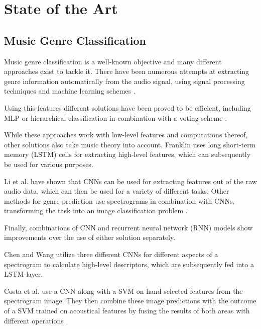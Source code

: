 
\chapter{State of the Art}

\label{stateofart}

\section{Music Genre Classification}

Music genre classification is a well-known objective and many different approaches exist to tackle it.
There have been numerous attempts at extracting genre information automatically from the audio signal, 
using signal processing techniques and machine learning schemes \cite{Aucouturier2003}.

Using this features different solutions have been proved to be efficient, 
including MLP or hierarchical classification in combination with a voting scheme \cite{Murauer2017}.

While these approaches work with low-level features and computations thereof, other solutions also take music theory into account.
Franklin \cite{Franklin2006} uses long short-term memory (LSTM) cells for extracting high-level features, which can subsequently be used for various
purposes. 

Li et al. \cite{Li2010} have shown that CNNs can be used for extracting features out of the raw audio data, which can then be used
for a variety of different tasks.
Other methods for genre prediction use spectrograms in combination with CNNs, transforming the task into an image classification
problem \cite{Gwardys2014}.

Finally, combinations of CNN and recurrent neural network
(RNN) models show improvements over the use of either solution
separately. 

Chen and Wang \cite{Chen2017} utilize three different CNNs for
different aspects of a spectrogram to calculate high-level descriptors,
which are subsequently fed into a LSTM-layer. 

Costa et al. \cite{Costa2017} use a CNN along with a SVM on hand-selected features from the
spectrogram image. They then combine these image predictions
with the outcome of a SVM trained on acoustical features by fusing
the results of both areas with different operations \cite{Murauer2018}.

